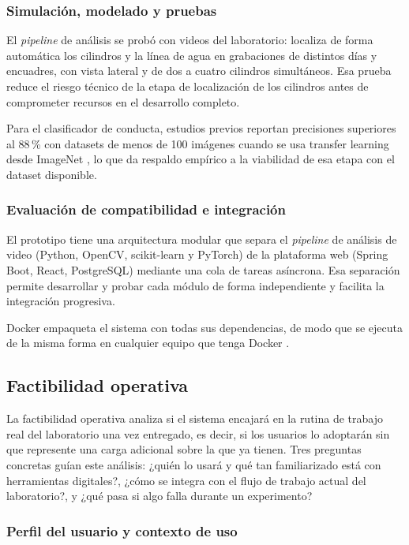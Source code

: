 \subsubsection{Simulación, modelado y pruebas}

El \textit{pipeline} de análisis se probó con
videos del laboratorio: localiza de forma automática los cilindros y la línea de agua
en grabaciones de distintos días y encuadres, con vista lateral y de dos a cuatro
cilindros simultáneos. Esa prueba reduce el riesgo técnico de la etapa de localización
de los cilindros antes de comprometer recursos en el desarrollo completo.

Para el clasificador de conducta, estudios previos reportan precisiones superiores al
88\,\% con datasets de menos de 100 imágenes cuando se usa transfer learning desde
ImageNet \cite{meng2024_dsaan}, lo que da respaldo empírico a la viabilidad de esa
etapa con el dataset disponible.

\subsubsection{Evaluación de compatibilidad e integración}

El prototipo tiene una arquitectura modular que separa el \textit{pipeline} de análisis de video
(Python, OpenCV, scikit-learn y PyTorch) de la plataforma web (Spring Boot, React, PostgreSQL) mediante una
cola de tareas asíncrona. Esa separación permite desarrollar y probar cada módulo de
forma independiente y facilita la integración progresiva.

Docker empaqueta el sistema con todas sus dependencias, de modo que se ejecuta de la misma forma en cualquier equipo que tenga Docker \cite{merkel2014}.

\subsection{Factibilidad operativa}

La factibilidad operativa analiza si el sistema encajará en la rutina de trabajo real
del laboratorio una vez entregado, es decir, si los usuarios lo adoptarán sin que
represente una carga adicional sobre la que ya tienen. Tres preguntas concretas guían
este análisis: ¿quién lo usará y qué tan familiarizado está con herramientas digitales?,
¿cómo se integra con el flujo de trabajo actual del laboratorio?, y ¿qué pasa si algo
falla durante un experimento?

\subsubsection{Perfil del usuario y contexto de uso}


